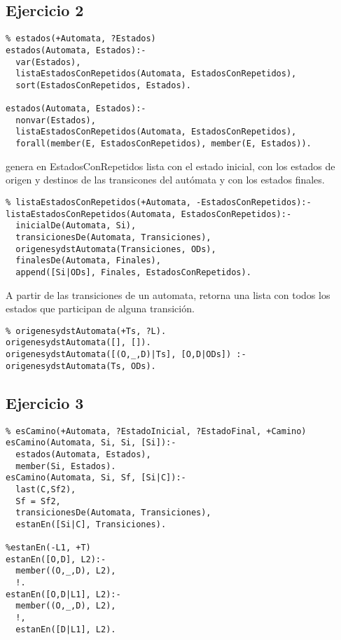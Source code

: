 \documentclass[10pt, a4paper,english,spanish,hidelinks]{article}
\begin{document}
\subsection{Ejercicio 2}

\begin{verbatim}
% estados(+Automata, ?Estados)
estados(Automata, Estados):-
  var(Estados),
  listaEstadosConRepetidos(Automata, EstadosConRepetidos),
  sort(EstadosConRepetidos, Estados).

estados(Automata, Estados):-
  nonvar(Estados),
  listaEstadosConRepetidos(Automata, EstadosConRepetidos),
  forall(member(E, EstadosConRepetidos), member(E, Estados)). 
\end{verbatim} 

genera en EstadosConRepetidos lista con el estado inicial, 
con los estados de origen y destinos de las transicones del autómata y con
los estados finales.

\begin{verbatim}
% listaEstadosConRepetidos(+Automata, -EstadosConRepetidos):-
listaEstadosConRepetidos(Automata, EstadosConRepetidos):-
  inicialDe(Automata, Si),
  transicionesDe(Automata, Transiciones),
  origenesydstAutomata(Transiciones, ODs),
  finalesDe(Automata, Finales),
  append([Si|ODs], Finales, EstadosConRepetidos).
\end{verbatim}


A partir de las transiciones de un automata, retorna una lista con todos los estados
que participan de alguna transición.

\begin{verbatim}
% origenesydstAutomata(+Ts, ?L).
origenesydstAutomata([], []).
origenesydstAutomata([(O,_,D)|Ts], [O,D|ODs]) :- origenesydstAutomata(Ts, ODs).
\end{verbatim}


\subsection{Ejercicio 3}
\begin{verbatim}
% esCamino(+Automata, ?EstadoInicial, ?EstadoFinal, +Camino)
esCamino(Automata, Si, Si, [Si]):-
  estados(Automata, Estados),
  member(Si, Estados).
esCamino(Automata, Si, Sf, [Si|C]):-
  last(C,Sf2),
  Sf = Sf2,
  transicionesDe(Automata, Transiciones),
  estanEn([Si|C], Transiciones).

%estanEn(-L1, +T)
estanEn([O,D], L2):-
  member((O,_,D), L2),
  !.
estanEn([O,D|L1], L2):-
  member((O,_,D), L2),
  !,
  estanEn([D|L1], L2).									
\end{verbatim}
\end{document}
